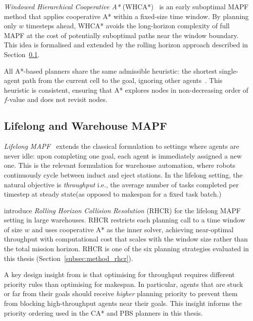 \emph{Windowed Hierarchical Cooperative A*}
(WHCA*)~\cite{silver2005cooperative} is an early suboptimal MAPF method that
applies cooperative A* within a fixed-size time window.
By planning only $w$ timesteps ahead, WHCA* avoids the long-horizon complexity
of full MAPF at the cost of potentially suboptimal paths near the window
boundary.
This idea is formalised and extended by the rolling horizon approach described
in Section~\ref{subsec:bg_mapf_lifelong}.

All A*-based planners share the same admissible heuristic: the shortest
single-agent path from the current cell to the goal, ignoring other
agents~\cite{hart1968astar}.
This heuristic is consistent, ensuring that A* explores nodes in non-decreasing
order of $f$-value and does not revisit nodes.


\subsection{Lifelong and Warehouse MAPF}
\label{subsec:bg_mapf_lifelong}

\emph{Lifelong MAPF}~\cite{li2021lifelong} extends the classical formulation to
settings where agents are never idle: upon completing one goal, each agent is
immediately assigned a new one.
This is the relevant formulation for warehouse automation, where robots
continuously cycle between induct and eject stations.
In the lifelong setting, the natural objective is \emph{throughput} i.e.,
the average number of tasks completed per timestep at steady state(as opposed to 
makespan for a fixed task batch.)

\citet{li2021lifelong} introduce \emph{Rolling Horizon Collision Resolution}
(RHCR) for the lifelong MAPF setting in large warehouses.
RHCR restricts each planning call to a time window of size $w$ and uses
cooperative A* as the inner solver, achieving near-optimal throughput with
computational cost that scales with the window size rather than the total
mission horizon.
RHCR is one of the six planning strategies evaluated in this thesis
(Section~\ref{subsec:method_rhcr}).

A key design insight from \citet{li2021lifelong} is that optimising for
throughput requires different priority rules than optimising for makespan.
In particular, agents that are stuck or far from their goals should receive
\emph{higher} planning priority to prevent them from blocking high-throughput
agents near their goals.
This insight informs the priority ordering used in the CA* and PBS planners
in this thesis.


